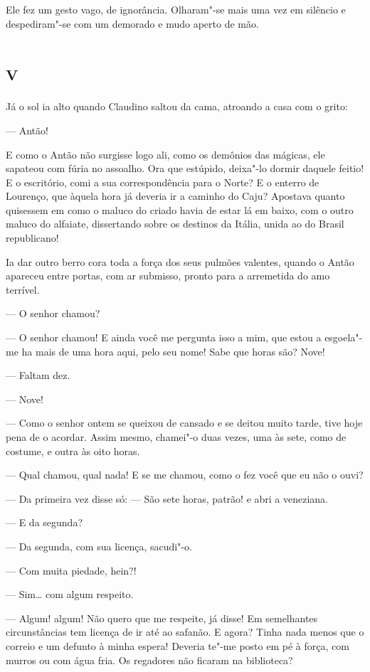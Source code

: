 Ele fez um gesto vago, de ignorância. Olharam"-se mais uma vez em
silêncio e despediram"-se com um demorado e mudo aperto de mão.

\section{\textsc{v}}

Já o sol ia alto quando Claudino saltou da cama, atroando a casa com o
grito:

--- Antão!

E como o Antão não surgisse logo ali, como os demônios das mágicas, ele
sapateou com fúria no assoalho. Ora que estúpido, deixa"-lo dormir
daquele feitio! E o escritório, comi a sua correspondência para o Norte?
E o enterro de Lourenço, que àquela hora já deveria ir a caminho do
Caju? Apostava quanto quisessem em como o maluco do criado havia de
estar lá em baixo, com o outro maluco do alfaiate, dissertando sobre os
destinos da Itália, unida ao do Brasil republicano!

Ia dar outro berro cora toda a força dos seus pulmões valentes, quando o
Antão apareceu entre portas, com ar submisso, pronto para a arremetida
do amo terrível.

--- O senhor chamou?

--- O senhor chamou! E ainda você me pergunta isso a mim, que estou a
esgoela"-me ha mais de uma hora aqui, pelo seu nome! Sabe que horas são?
Nove!

--- Faltam dez.

--- Nove!

--- Como o senhor ontem se queixou de cansado e se deitou muito tarde,
tive hoje pena de o acordar. Assim mesmo, chamei"-o duas vezes, uma às
sete, como de costume, e outra às oito horas.

--- Qual chamou, qual nada! E se me chamou, como o fez você que eu não o
ouvi?

--- Da primeira vez disse só: --- São sete horas, patrão! e abri a
veneziana.

--- E da segunda?

--- Da segunda, com sua licença, sacudi"-o.

--- Com muita piedade, hein?!

--- Sim\ldots{} com algum respeito.

--- Algum! algum! Não quero que me respeite, já disse! Em semelhantes
circunstâncias tem licença de ir até ao safanão. E agora? Tinha nada
menos que o correio e um defunto à minha espera! Deveria te"-me posto em
pé à força, com murros ou com água fria. Os regadores não ficaram na
biblioteca?

